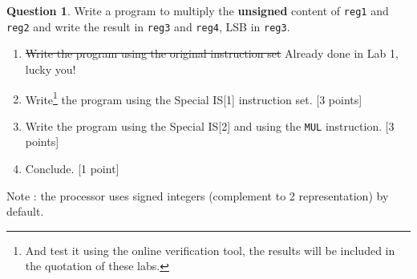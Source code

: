 \documentclass[10pt,a4paper]{article}
\theoremstyle{definition}%
\newtheorem{Q}{Question}[] %
\newcommand{\reg}[1]{\texttt{reg#1}}
\begin{document}
\begin{Q}

Write a program to multiply the \textbf{unsigned} content of \reg{1} and \reg{2} and write the result in \reg{3} and \reg{4}, LSB in \reg{3}.
\begin{enumerate}
\item \sout{Write the program using the original instruction set} Already done in Lab 1, lucky you!
\item Write\footnote{\label{assign}And test it using the online verification tool, the results will be included in the quotation of these labs.} the program using the Special IS[1] instruction set. [3 points]
\item Write the program using the Special IS[2] and using the \verb!MUL! instruction. [3 points]
\item Conclude. [1 point]
\end{enumerate}
Note : the processor uses signed integers (complement to 2 representation) by default.
\end{Q}
\end{document}
